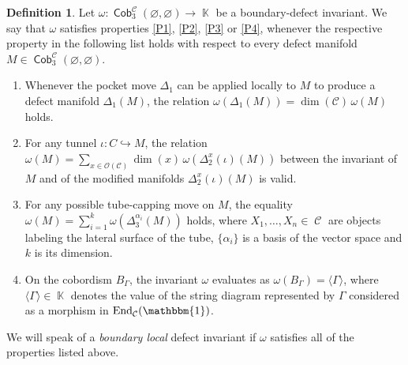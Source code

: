 \documentclass[pdftex]{sigma}
\DeclareMathOperator{\End}{End}
\DeclareMathOperator{\Hom}{Hom}
\DeclareMathOperator{\K}{\mathbb{K}}
\DeclareMathOperator{\Cob}{\mathsf{Cob}}
\DeclareMathOperator{\calc}{\mathcal{C}}
\numberwithin{equation}{section}
\theoremstyle{definition}
\newtheorem{Definition}[Definition]{Definition}
\begin{document}
\begin{Definition} \label{defPropInv}
Let $\omega\colon \Cob_3^{\calc}(\varnothing, \varnothing) \rightarrow \K $ be a boundary-defect invariant. We say that $\omega$ satisfies properties \ref{P1}, \ref{P2}, \ref{P3} or \ref{P4}, whenever the respective property in the following list holds with respect to every defect manifold $M \in \Cob_3^{\calc}(\varnothing, \varnothing)$.
 \begin{enumerate}[(P1)]\itemsep=0pt
 \item \label{P1} Whenever the pocket move $\Delta_1$ can be applied locally to $M$ to produce a defect manifold $\Delta_1(M)$, the relation $\omega(\Delta_1(M)) = \dim (\mathcal{C})\, \omega(M)$ holds.
 \item \label{P2} For any tunnel $\iota\colon C \hookrightarrow M$, the relation $\omega(M) = \sum_{x \in \mathcal{O}(\mathcal{C})}\dim(x) \, \omega(\Delta_2^x(\iota)(M))$ between the invariant of $M$ and of the modified manifolds $\Delta_2^x(\iota)(M)$ is valid.
 \item \label{P3} For any possible tube-capping move on $M$, the equality $\omega(M) = \sum_{i = 1}^{k}\omega(\Delta_3^{\alpha_i}(M))$ holds, where $X_1, \dots, X_n \in \calc$ are objects labeling the lateral surface of the tube, $\{\alpha_i\}$ is a basis of the vector space \smash{$\Hom_{\calc}\bigl(X_1^{\varepsilon(1)} \otimes \dots \otimes X_n^{\varepsilon(n)}, \mathbbm{1}\bigr)$} and $k$ is its dimension.
 \item \label{P4} On the cobordism $B_\Gamma$, the invariant $\omega$ evaluates as $\omega(B_{\Gamma}) = \langle \Gamma \rangle$, where $\langle \Gamma \rangle \in \K$ denotes the value of the string diagram represented by $\Gamma$ considered as a morphism in $\End_{\calc}(\mathbbm{1})$.
 \end{enumerate}
 We will speak of a \textit{boundary local} defect invariant if $\omega$ satisfies all of the properties listed above.
\end{Definition}
\end{document}
